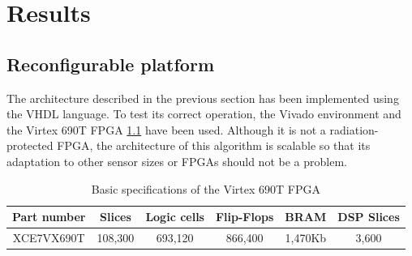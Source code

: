 \cleardoublepage
\chapter{Results}
\label{makereference}
\section{Reconfigurable platform}
The architecture described in the previous section has been implemented using the VHDL language. To test its correct operation, the Vivado environment and the Virtex 690T FPGA \ref{basic} have been used. Although it is not a radiation-protected FPGA, the architecture of this algorithm is scalable so that its adaptation to other sensor sizes or FPGAs should not be a problem.
\begin{table}
\begin{center}
 \begin{tabular}{|c|c|c|c|c|c|} 
 \hline
 Part number & Slices & Logic cells & Flip-Flops & BRAM & DSP Slices \\
 \hline
 XCE7VX690T & 108,300 & 693,120 & 866,400 & 1,470Kb & 3,600\\
 \hline
\end{tabular}
\end{center}
\caption{Basic specifications of the Virtex 690T FPGA}
\label{basic}
\end{table}

